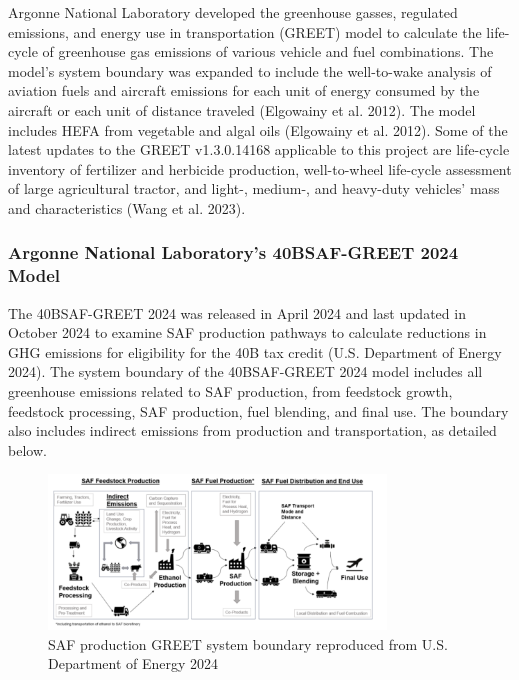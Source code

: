 \documentclass[12pt]{article}
\begin{document}
Argonne National Laboratory developed the greenhouse gasses, regulated emissions, and energy use in transportation (GREET) model to calculate the life-cycle of greenhouse gas emissions of various vehicle and fuel combinations. The model’s system boundary was expanded to include the well-to-wake analysis of aviation fuels and aircraft emissions for each unit of energy consumed by the aircraft or each unit of distance traveled (Elgowainy et al. 2012). The model includes HEFA from vegetable and algal oils (Elgowainy et al. 2012). Some of the latest updates to the GREET v1.3.0.14168 applicable to this project are life-cycle inventory of fertilizer and herbicide production, well-to-wheel life-cycle assessment of large agricultural tractor, and light-, medium-, and heavy-duty vehicles’ mass and characteristics (Wang et al. 2023).

\subsubsection{Argonne National Laboratory’s 40BSAF-GREET 2024 Model
}
The 40BSAF-GREET 2024 was released in April 2024 and last updated in October 2024 to examine SAF production pathways to calculate reductions in GHG emissions for eligibility for the 40B tax credit (U.S. Department of Energy 2024). The system boundary of the 40BSAF-GREET 2024 model includes all greenhouse emissions related to SAF production, from feedstock growth, feedstock processing, SAF production, fuel blending, and final use. The boundary also includes indirect emissions from production and transportation, as detailed below. 

\begin{figure}[H]
\centering
\includegraphics[width=0.8\textwidth]{Figures/Figure 11.png} %
\caption{SAF production GREET system boundary reproduced from U.S. Department of Energy 2024}
\label{fig:figure11}
\end{figure}
\end{document}
